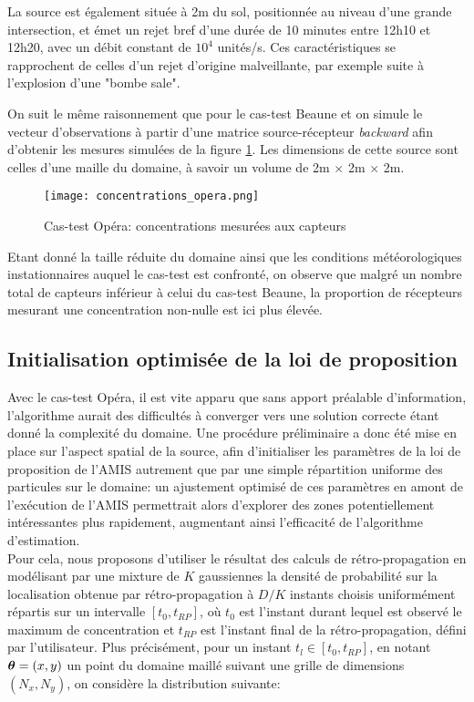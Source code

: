 La source est également située à 2m du sol, positionnée au niveau d'une grande intersection, et émet un rejet bref d'une durée de 10 minutes entre 12h10 et 12h20, avec un débit constant de $10^4$ unités/s. Ces caractéristiques se rapprochent de celles d'un rejet d'origine malveillante, par exemple suite à l'explosion d'une "bombe sale". 

On suit le même raisonnement que pour le cas-test Beaune et on simule le vecteur d'observations à partir d'une matrice source-récepteur \textit{backward} afin d'obtenir les mesures simulées de la figure \ref{fig_opera_obs}. Les dimensions de cette source sont celles d'une maille du domaine, à savoir un volume de 2m $\times$ 2m $\times$ 2m.

\begin{figure}[h!]
	\centering
	\texttt{[image: concentrations\_opera.png]}
	\caption{Cas-test Opéra: concentrations mesurées aux capteurs}
	\label{fig_opera_obs}
\end{figure}

Etant donné la taille réduite du domaine ainsi que les conditions météorologiques instationnaires auquel le cas-test est confronté, on observe que malgré un nombre total de capteurs inférieur à celui du cas-test Beaune, la proportion de récepteurs mesurant une concentration non-nulle est ici plus élevée.


\subsection{Initialisation optimisée de la loi de proposition}

Avec le cas-test Opéra, il est vite apparu que sans apport préalable d'information, l'algorithme aurait des difficultés à converger vers une solution correcte étant donné la complexité du domaine. Une procédure préliminaire a donc été mise en place sur l'aspect spatial de la source, afin d'initialiser les paramètres de la loi de proposition de l'AMIS autrement que par une simple répartition uniforme des particules sur le domaine: un ajustement optimisé de ces paramètres en amont de l'exécution de l'AMIS permettrait alors d'explorer des zones potentiellement intéressantes plus rapidement, augmentant ainsi l'efficacité de l'algorithme d'estimation. \\

Pour cela, nous proposons d'utiliser le résultat des calculs de rétro-propagation en modélisant par une mixture de $K$ gaussiennes la densité de probabilité sur la localisation obtenue par rétro-propagation à $D/K$ instants choisis uniformément répartis sur un intervalle $[t_0, t_{RP}]$, où $t_0$ est l'instant durant lequel est observé le maximum de concentration et $t_{RP}$ est l'instant final de la rétro-propagation, défini par l'utilisateur. Plus précisément, pour un instant $t_l \in [t_0,t_{RP}]$, en notant ${\bm{\theta}} = (x,y)$ un point du domaine maillé suivant une grille de dimensions $(N_x,N_y)$, on considère la distribution suivante:

